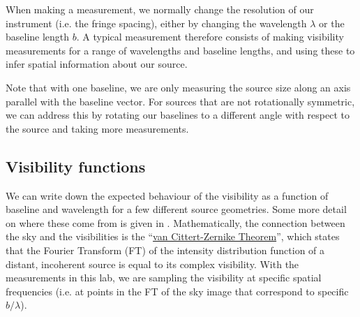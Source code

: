 \documentclass[11pt]{article}
\begin{document}


When making a measurement, we normally change the resolution of our instrument (i.e. the fringe spacing), either by changing the wavelength $\lambda$ or the baseline length $b$. A typical measurement therefore consists of making visibility measurements for a range of wavelengths and baseline lengths, and using these to infer spatial information about our source.

Note that with one baseline, we are only measuring the source size along an axis parallel with the baseline vector. For sources that are not rotationally symmetric, we can address this by rotating our baselines to a different angle with respect to the source and taking more measurements.

\subsection{Visibility functions}

We can write down the expected behaviour of the visibility as a function of baseline and wavelength for a few different source geometries. Some more detail on where these come from is given in \citet[][e.g. Fig 2.13]{2011psi..book.....G}. Mathematically, the connection between the sky and the visibilities is the ``\href{https://en.wikipedia.org/wiki/Van_Cittert%E2%80%93Zernike_theorem}{van Cittert-Zernike Theorem}'', which states that the Fourier Transform (FT) of the intensity distribution function of a distant, incoherent source is equal to its complex visibility. With the measurements in this lab, we are sampling the visibility at specific spatial frequencies (i.e. at points in the FT of the sky image that correspond to specific $b/\lambda$).
\end{document}
